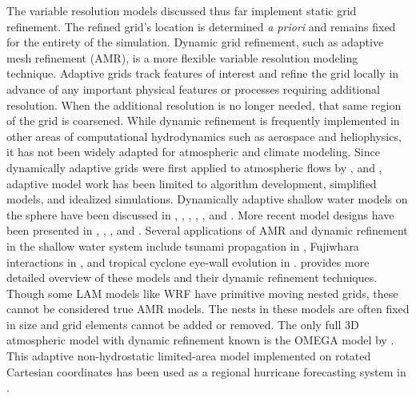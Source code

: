 The variable resolution models discussed thus far implement static grid refinement.
The refined grid's location is determined \emph{a priori} and remains fixed for
the entirety of the simulation. Dynamic grid refinement, such as adaptive mesh refinement (AMR),
is a more flexible variable resolution modeling technique. Adaptive grids track features of interest
and refine the grid locally in advance of any important physical features or processes requiring
additional resolution. When the additional resolution is no longer needed, that same region of
the grid is coarsened.
While dynamic refinement is frequently implemented in other areas of computational 
hydrodynamics such as aerospace and heliophysics, it has not been widely adapted
for atmospheric and climate modeling. Since dynamically adaptive grids were first
applied to atmospheric flows by \cite{skamarock1989adaptive},
\cite{skamarock1993adaptive} and \cite{Dietachmayer:1992sj}, adaptive model
work has been limited to algorithm development, simplified models, and idealized simulations.
Dynamically adaptive shallow water models on the sphere have been discussed in
\cite{giraldo2000lagrange}, \cite{behrens2005amatos}, \cite{lauter2007parallel}, 
\cite{st2007comparison}, \cite{kubatko2009dynamic}, and \cite{Chen:2011kk}.
More recent model designs have been presented in \cite{mccorquodale2015adaptive},
\cite{tumolo2015semi}, \cite{aechtner2015conservative}, and \cite{weller2016mesh}.
Several applications of AMR and dynamic refinement in the shallow water system 
include tsunami propagation in \cite{blaise2012dynamic}, Fujiwhara interactions in
\cite{bauer2014simulation}, and tropical cyclone eye-wall evolution in
\cite{hendricks2016evaluation}. \cite{ferguson2016analyzing} provides
more detailed overview of these models and their dynamic refinement techniques.
 Though some LAM models like 
WRF \citep{shepherd2017sensitivity} have primitive 
moving nested grids, these cannot be considered true AMR models. 
The nests in these models are often fixed in size and grid elements cannot 
be added or removed. The only full 
3D atmospheric model with dynamic refinement known is the OMEGA
model by \cite{bacon2000dynamically}. This adaptive non-hydrostatic limited-area model
implemented on rotated Cartesian coordinates has been used as a regional hurricane
forecasting system in \cite{gopalakrishnan2002operational}.

